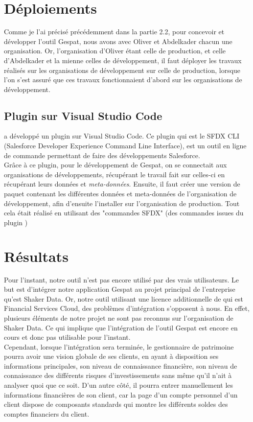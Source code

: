 \documentclass[12pt,oneside,noprintercorrection]{iut}
\begin{document}
\section{Déploiements}
Comme je l'ai précisé précédemment dans la partie 2.2, pour concevoir et développer l'outil Gespat, nous avons avec Oliver et Abdelkader chacun une organisation. Or, l'organisation d'Oliver étant celle de production, et celle d'Abdelkader et la mienne celles de développement, il faut déployer les travaux réalisés sur les organisations de développement sur celle de production, lorsque l'on s'est assuré que ces travaux fonctionnaient d'abord sur les organisations de développement.
\subsection{Plugin \slf{} sur Visual Studio Code}
\slf{} a développé un plugin sur Visual Studio Code. Ce plugin qui est le SFDX CLI (Salesforce Developer Experience Command Line Interface), est un outil en ligne de commande permettant de faire des développements Salesforce.
 ~\\\indent Grâce à ce plugin, pour le développement de Gespat, on se connectait aux organisations de développements, récupérant le travail fait sur celles-ci en récupérant leurs données et \textit{meta-données}. Ensuite, il faut créer une version de paquet contenant les différentes données et meta-données de l'organisation de développement, afin d'ensuite l'installer sur l'organisation de production. Tout cela était réalisé en utilisant des "commandes SFDX" (des commandes issues du plugin \slf{})
 
 \section{Résultats}
 Pour l'instant, notre outil n'est pas encore utilisé par des vrais utilisateurs. Le but est d'intégrer notre application Gespat au projet principal de l'entreprise qu'est Shaker Data. Or, notre outil utilisant une licence additionnelle de \slf qui est Financial Services Cloud, des problèmes d'intégration s'opposent à nous. En effet, plusieurs éléments de notre projet ne sont pas reconnus sur l'organisation de Shaker Data. Ce qui implique que l'intégration de l'outil Gespat est encore en cours et donc pas utilisable pour l'instant.
 ~\\\indent Cependant, lorsque l'intégration sera terminée, le gestionnaire de patrimoine pourra avoir une vision globale de ses clients, en ayant à disposition ses informations principales, son niveau de connaissance financière, son niveau de connaissance des différents risques d'investissements sans même qu'il n'ait à analyser quoi que ce soit. D'un autre côté, il pourra entrer manuellement les informations financières de son client, car la page d'un compte personnel d'un client dispose de composants standards qui montre les différents soldes des comptes financiers du client.
 
\end{document}
